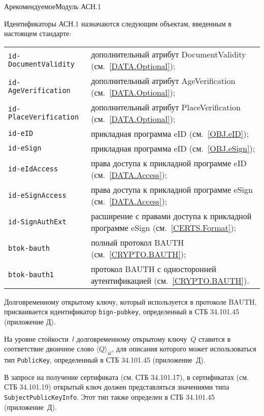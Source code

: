\begin{appendix}{А}{рекомендуемое}{Модуль АСН.1}
\label{ASN}

\mbox{}


Идентификаторы АСН.1 назначаются следующим объектам, введенным в настоящем стандарте:
\begin{center}
\begin{tabular}{p{4.5cm}p{11.5cm}}
\verb|id-DocumentValidity| &
дополнительный атрибут DocumentValidity (см.~\ref{DATA.Optional});\\
%
\verb|id-AgeVerification| &
дополнительный атрибут AgeVerification (см.~\ref{DATA.Optional});\\
%
\verb|id-PlaceVerification| &
дополнительный атрибут PlaceVerification (см.~\ref{DATA.Optional});\\
%
\verb|id-eID| &
прикладная программа eID (см.~\ref{OBJ.eID});\\
%
\verb|id-eSign| &
прикладная программа eID (см.~\ref{OBJ.eSign});\\
%
\verb|id-eIdAccess| &
права доступа к прикладной программе eID 
(см.~\ref{DATA.Access});\\
%
\verb|id-eSignAccess| &
права доступа к прикладной программе eSign 
(см.~\ref{DATA.Access});\\
%
\verb|id-SignAuthExt| &
расширение с правами доступа к прикладной программе eSign 
(см.~\ref{CERTS.Format});\\
%
\verb|btok-bauth| &
полный протокол BAUTH 
(см.~\ref{CRYPTO.BAUTH});\\
%
\verb|btok-bauth1| &
протокол BAUTH с односторонней аутентификацией
(см.~\ref{CRYPTO.BAUTH}).\\
\end{tabular}
\end{center}

Долговременному открытому ключу, который используется в протоколе 
BAUTH, присваивается идентификатор \verb|bign-pubkey|, определенный в СТБ 
34.101.45 (приложение Д).


На уровне стойкости~$l$ долговременному открытому ключу~$Q$ ставится в 
соответствие двоичное слово $\langle Q\rangle_{4l}$, для описания которого может 
использоваться тип \verb|PublicKey|, определенный в СТБ 34.101.45 (приложение~Д). 

В запросе на получение сертификата (см. СТБ 34.101.17), в сертификатах (см. СТБ 
34.101.19) открытый ключ должен представляться значениями типа 
\verb|SubjectPublicKeyInfo|. Этот тип также определен в СТБ 34.101.45 
(приложение~Д). 


\end{appendix}
